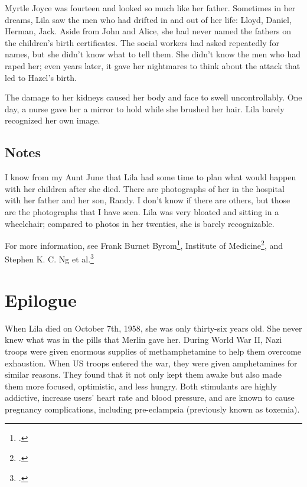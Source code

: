 \documentclass[
  letterpaper,
]{book}
\begin{document}
Myrtle Joyce was fourteen and looked so much like her father. Sometimes
in her dreams, Lila saw the men who had drifted in and out of her life:
Lloyd, Daniel, Herman, Jack. Aside from John and Alice, she had never
named the fathers on the children's birth certificates. The social
workers had asked repeatedly for names, but she didn't know what to tell
them. She didn't know the men who had raped her; even years later, it
gave her nightmares to think about the attack that led to Hazel's birth.

The damage to her kidneys caused her body and face to swell
uncontrollably. One day, a nurse gave her a mirror to hold while she
brushed her hair. Lila barely recognized her own image.

\section{Notes}\label{notes-59}

I know from my Aunt June that Lila had some time to plan what would
happen with her children after she died. There are photographs of her in
the hospital with her father and her son, Randy. I don't know if there
are others, but those are the photographs that I have seen. Lila was
very bloated and sitting in a wheelchair; compared to photos in her
twenties, she is barely recognizable.

For more information, see Frank Burnet Byrom\footnote{.}, Institute of Medicine\footnote{.}, and Stephen
K. C. Ng et al.\footnote{.}


\chapter{Epilogue}\label{epilogue}

When Lila died on October 7th, 1958, she was only thirty-six years old.
She never knew what was in the pills that Merlin gave her. During World
War II, Nazi troops were given enormous supplies of methamphetamine to
help them overcome exhaustion. When US troops entered the war, they were
given amphetamines for similar reasons. They found that it not only kept
them awake but also made them more focused, optimistic, and less hungry.
Both stimulants are highly addictive, increase users' heart rate and
blood pressure, and are known to cause pregnancy complications,
including pre-eclampsia (previously known as toxemia).
\end{document}
